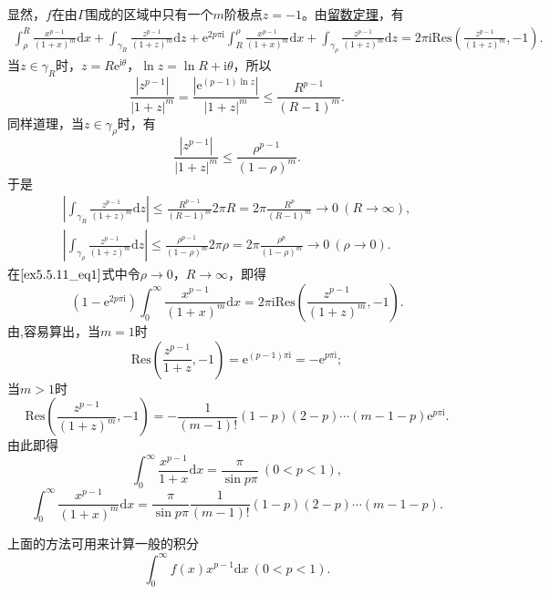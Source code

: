 \documentclass[../../main.tex]{subfiles}%
\begin{document}
\begin{solution}
显然，\( f \)在由\( \Gamma \)围成的区域中只有一个\( m \)阶极点\( z = -1 \)。由\hyperref[theorem:留数定理(残数定理)-定理5.4.9]{留数定理}，有
\begin{align}
\int_{\rho}^{R} \frac{x^{p - 1}}{(1 + x)^m} \mathrm{d}x + \int_{\gamma_R} \frac{z^{p - 1}}{(1 + z)^m} \mathrm{d}z + \mathrm{e}^{2p\pi \mathrm{i}} \int_{R}^{\rho} \frac{x^{p - 1}}{(1 + x)^m} \mathrm{d}x
+ \int_{\gamma_{\rho}} \frac{z^{p - 1}}{(1 + z)^m} \mathrm{d}z = 2\pi \mathrm{i} \mathrm{Res}\left( \frac{z^{p - 1}}{(1 + z)^m}, -1 \right). \label{ex5.5.11_eq1}
\end{align}
当\( z \in \gamma_R \)时，\( z = R\mathrm{e}^{\mathrm{i}\theta} \)，\( \ln z = \ln R + \mathrm{i}\theta \)，所以
\[
\frac{|z^{p - 1}|}{|1 + z|^m} = \frac{|\mathrm{e}^{(p - 1)\ln z}|}{|1 + z|^m} \leqslant \frac{R^{p - 1}}{(R - 1)^m}.
\]
同样道理，当\( z \in \gamma_{\rho} \)时，有
\[
\frac{|z^{p - 1}|}{|1 + z|^m} \leqslant \frac{\rho^{p - 1}}{(1 - \rho)^m}.
\]
于是
\begin{gather*}
\left| \int_{\gamma_R} \frac{z^{p - 1}}{(1 + z)^m} \mathrm{d}z \right| \leqslant \frac{R^{p - 1}}{(R - 1)^m} 2\pi R
= 2\pi \frac{R^p}{(R - 1)^m}
\to 0 \ (R \to \infty),
\\
\left| \int_{\gamma_{\rho}} \frac{z^{p - 1}}{(1 + z)^m} \mathrm{d}z \right| \leqslant \frac{\rho^{p - 1}}{(1 - \rho)^m} 2\pi \rho
= 2\pi \frac{\rho^p}{(1 - \rho)^m}
\to 0 \ (\rho \to 0).
\end{gather*}
在\(\eqref{ex5.5.11_eq1}\)式中令\( \rho \to 0 \)，\( R \to \infty \)，即得
\[
(1 - \mathrm{e}^{2p\pi \mathrm{i}}) \int_{0}^{\infty} \frac{x^{p - 1}}{(1 + x)^m} \mathrm{d}x = 2\pi \mathrm{i} \mathrm{Res}\left( \frac{z^{p - 1}}{(1 + z)^m}, -1 \right).
\]
由,容易算出，当\( m = 1 \)时
\[
\mathrm{Res}\left( \frac{z^{p - 1}}{1 + z}, -1 \right) = \mathrm{e}^{(p - 1)\pi \mathrm{i}} = -\mathrm{e}^{p\pi \mathrm{i}};
\]
当\( m > 1 \)时
\[
\mathrm{Res}\left( \frac{z^{p - 1}}{(1 + z)^m}, -1 \right) = -\frac{1}{(m - 1)!}(1 - p)(2 - p)
\cdots (m - 1 - p) \mathrm{e}^{p\pi \mathrm{i}}.
\]
由此即得
\[
\int_{0}^{\infty} \frac{x^{p - 1}}{1 + x} \mathrm{d}x = \frac{\pi}{\sin p\pi} \ (0 < p < 1),
\]
\[
\int_{0}^{\infty} \frac{x^{p - 1}}{(1 + x)^m} \mathrm{d}x = \frac{\pi}{\sin p\pi} \frac{1}{(m - 1)!}(1 - p)(2 - p)
\cdots (m - 1 - p).
\]

\end{solution}
\begin{remark}
上面的方法可用来计算一般的积分
\[
\int_{0}^{\infty} f(x) x^{p - 1} \mathrm{d}x \ (0 < p < 1).
\]
\end{remark}
\end{document}
